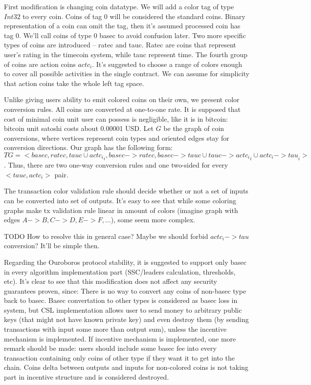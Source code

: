 \documentclass[]{itmo-student-thesis}
\begin{document}
First modification is changing coin datatype. We will add a color tag
of type $Int32$ to every coin. Coins of tag $0$ will be considered the
standard coins. Binary representation of a coin can omit the tag, then
it’s assumed processed coin has tag 0. We’ll call coins of type $0$
basec to avoid confusion later. Two more specific types of coins are
introduced -- ratec and tauc. Ratec are coins that represent user’s
rating in the timecoin system, while tauc represent time. The fourth
group of coins are action coins $actc_i$. It’s suggested to choose a
range of colors enough to cover all possible activities in the single
contract. We can assume for simplicity that action coins take the
whole left tag space.

Unlike giving users ability to emit colored coins on their own, we
present color conversion rules.  All coins are converted at one-to-one
rate. It is supposed that cost of minimal coin unit user can possess
is negligible, like it is in bitcoin: bitcoin unit satoshi costs about
0.00001 USD. Let $G$ be the graph of coin conversions, where vertices
represent coin types and oriented edges stay for conversion
directions. Our graph has the following form: $TG = <{basec, ratec,
  tauc} \cup {actc_i}_i, {basec -> ratec, basec -> tauc} \cup {tauc ->
  actc_i}_i \cup {actc_i -> tau}_i>$. Thus, there are two one-way
conversion rules and one two-sided for every $<tauc, actc_i>$ pair.

The transaction color validation rule should decide whether or not a
set of inputs can be converted into set of outputs. It’s easy to see
that while some coloring graphs make tx validation rule linear in
amount of colors (imagine graph with edges ${A -> B, C -> D, E ->F,
  …}$), some seem more complex.

TODO How to resolve this in general case? Maybe we should forbid
$actc_i -> tau$ conversion? It’ll be simple then.

Regarding the Ouroboros protocol stability, it is suggested to support
only basec in every algorithm implementation part (SSC/leaders
calculation, thresholds, etc). It’s clear to see that this
modification does not affect any security guarantees proven, since:
There is no way to convert any coins of non-basec type back to basec.
Basec convertation to other types is considered as basec loss in
system, but CSL implementation allows user to send money to arbitrary
public keys (that might not have known private key) and even destroy
them (by sending transactions with input some more than output sum),
unless the incentive mechanism is implemented. If incentive mechanism
is implemented, one more remark should be made: users should include
some basec fee into every transaction containing only coins of other
type if they want it to get into the chain. Coins delta between
outputs and inputs for non-colored coins is not taking part in
incentive structure and is considered destroyed.
\end{document}
